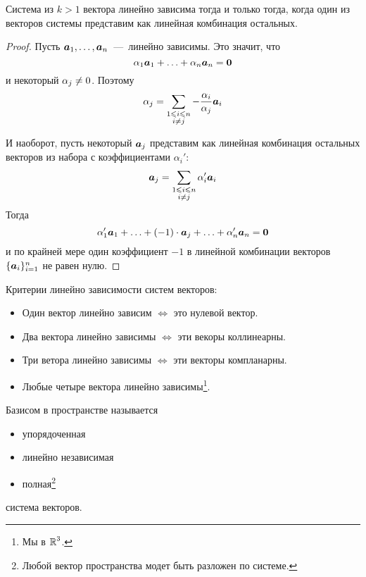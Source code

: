 \documentclass[a4paper,12pt]{article}
\begin{document}
  \begin{theorem}
    Система из $k > 1$ вектора линейно зависима тогда и только тогда, когда один из векторов системы представим как линейная комбинация остальных.
  \end{theorem}
  
  \begin{proof}
    Пусть $\boldsymbol a_1, \ldots, \boldsymbol a_n$~---~линейно зависимы.
    Это значит, что
    \[
      \alpha_1 \boldsymbol a_1 + \ldots + \alpha_n \boldsymbol a_n = \boldsymbol 0
    \]
    и некоторый $\alpha_j \hm{\not=} 0$.
    Поэтому
    \[
      \alpha_j = \sum\limits_{\substack{1 \leqslant i \leqslant n\\i \not= j}} -\frac{\alpha_i}{\alpha_j} \boldsymbol a_i
    \]
    
    И наоборот, пусть некоторый $\boldsymbol a_j$ представим как линейная комбинация остальных векторов из набора с коэффициентами $\alpha_i'$:
    \[
      \boldsymbol a_j = \sum\limits_{\substack{1 \leqslant i \leqslant n\\i \not= j}} \alpha_i' \boldsymbol a_i
    \]
    Тогда
    \[
      \alpha_1' \boldsymbol a_1 + \ldots + (-1) \cdot \boldsymbol a_j + \ldots + \alpha_n' \boldsymbol a_n = \boldsymbol 0
    \]
    и по крайней мере один коэффициент $-1$ в линейной комбинации векторов $\{\boldsymbol a_i\}_{i=1}^n$ не равен нулю.
  \end{proof}
  
  \begin{theorem}\label{theo:linear-dependence-criteria}
    Критерии линейно зависимости систем векторов:
    \begin{itemize}
      \item Один вектор линейно зависим $\Leftrightarrow$ это нулевой вектор.
      \item Два вектора линейно зависимы $\Leftrightarrow$ эти векоры коллинеарны.
      \item Три ветора линейно зависимы $\Leftrightarrow$ эти векторы компланарны.
      \item Любые четыре вектора линейно зависимы\footnote{Мы в $\operatorname{\mathbb R}^3$.}.
    \end{itemize}
  \end{theorem}
  
  \begin{definition}[Базис]
    Базисом в пространстве называется
    \begin{itemize}
      \item упорядоченная
      \item линейно независимая
      \item полная\footnote{Любой вектор пространства модет быть разложен по системе.}
    \end{itemize}
    система векторов.
  \end{definition}
  
\end{document}
